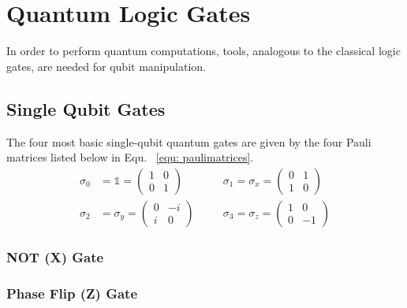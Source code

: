 



\section{Quantum Logic Gates}
\label{subsec:quantumlogicgates}
In order to perform quantum computations, tools, analogous to the classical logic gates, are needed for qubit manipulation. 

\subsection{Single Qubit Gates}
\label{subsubsec:singlequbitgates}
The four most basic single-qubit quantum gates are given by the four Pauli matrices listed below in Equ. ~\ref{equ: paulimatrices}.
\begin{align}
\label{equ: paulimatrices}
\sigma_{0} &= \mathbb{1} = \begin{pmatrix}
 1 & 0 \\ 
 0 & 1
 \end{pmatrix}
 \quad
 &&\sigma_{1} = \sigma_{x} = \begin{pmatrix}
 0 & 1 \\ 
 1 & 0
 \end{pmatrix}
 \nonumber
 \\
 \sigma_{2} &= \sigma_{y} = \begin{pmatrix}
 0 & -i \\ 
 i & 0
 \end{pmatrix}
 \quad
 &&\sigma_{3} = \sigma_{z} = \begin{pmatrix}
 1 & 0 \\ 
 0 & -1
 \end{pmatrix}
\end{align}

\subsubsection{NOT (X) Gate}
\label{subsubsubsec:xgate}

\subsubsection{Phase Flip (Z) Gate}
\label{subsubsubsec:zgate}

